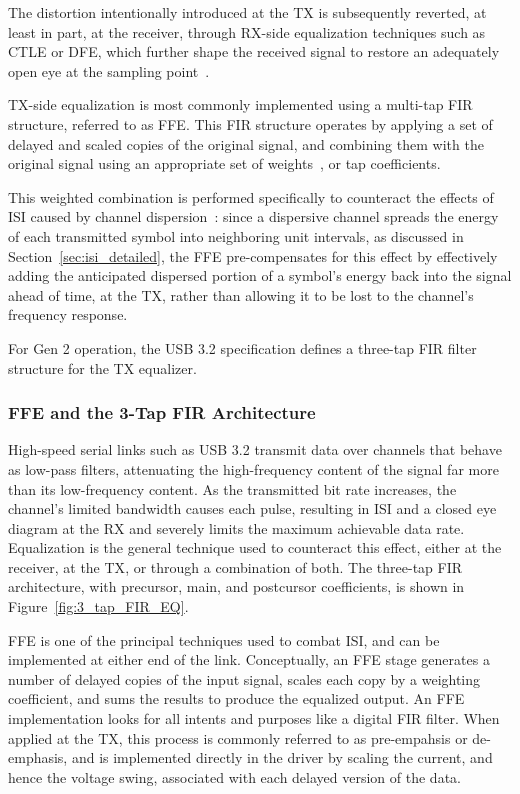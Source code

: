 The distortion intentionally introduced at the \ac{TX} is subsequently reverted, at least in part, at the receiver, through \ac{RX}-side equalization techniques such as \ac{CTLE} or \ac{DFE}, which further shape the received signal to restore an adequately open eye at the sampling point~\cite{zamir2018_nrz_pam4}.

\ac{TX}-side equalization is most commonly implemented using a multi-tap \ac{FIR} structure, referred to as \ac{FFE}. This \ac{FIR} structure operates by applying a set of delayed and scaled copies of the original signal, and combining them with the original signal using an appropriate set of weights~\cite{chen_tx_equalizer_2009,sredojevic_jssc_2011}, or tap coefficients.

This weighted combination is performed specifically to counteract the effects of \ac{ISI} caused by channel dispersion~\cite{zamir2018_nrz_pam4}: since a dispersive channel spreads the energy of each transmitted symbol into neighboring unit intervals, as discussed in Section~\ref{sec:isi_detailed}, the \ac{FFE} pre-compensates for this effect by effectively adding the anticipated dispersed portion of a symbol's energy back into the signal ahead of time, at the \ac{TX}, rather than allowing it to be lost to the channel's frequency response.

For Gen 2 operation, the \ac{USB} 3.2 specification defines a three-tap \ac{FIR} filter structure for the \ac{TX} equalizer.

\subsubsection{\acs*{FFE} and the 3-Tap \acs*{FIR} Architecture} %

High-speed serial links such as \ac{USB} 3.2 transmit data over channels that behave as low-pass filters, attenuating the high-frequency content of the signal far more than its low-frequency content. As the transmitted bit rate increases, the channel's limited bandwidth causes each pulse, resulting in \ac{ISI} and a closed eye diagram at the \ac{RX} and severely limits the maximum achievable data rate. Equalization is the general technique used to counteract this effect, either at the receiver, at the \ac{TX}, or through a combination of both.
The three-tap \ac{FIR} architecture, with precursor, main, and postcursor coefficients, is shown in Figure~\ref{fig:3_tap_FIR_EQ}.

\ac{FFE} is one of the principal techniques used to combat \ac{ISI}, and can be implemented at either end of the link. Conceptually, an \ac{FFE} stage generates a number of delayed copies of the input signal, scales each copy by a weighting coefficient, and sums the results to produce the equalized output. An \ac{FFE} implementation looks for all intents and purposes like a digital \ac{FIR} filter. When applied at the \ac{TX}, this process is commonly referred to as pre-empahsis or de-emphasis, and is implemented directly in the driver by scaling the current, and hence the voltage swing, associated with each delayed version of the data.

